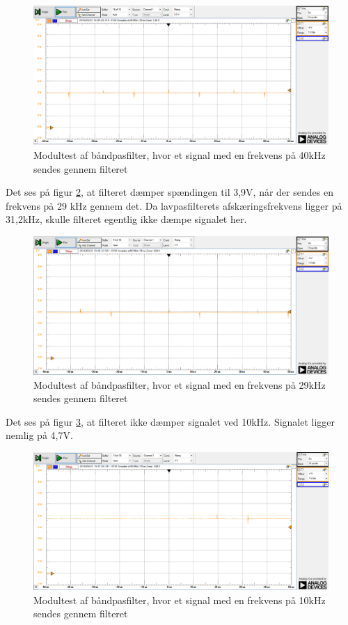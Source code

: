 \begin{figure}[H]
	\centering
	\includegraphics[width=\textwidth]{Test/images/AffyringTest/BaandpasfilterTest/40kHz}
	\caption{Modultest af båndpasfilter, hvor et signal med en frekvens på 40kHz sendes gennem filteret}
	\label{fig:40kHz}
\end{figure}

Det ses på figur \ref{fig:29kHz}, at filteret dæmper spændingen til 3,9V, når der sendes en frekvens på 29 kHz gennem det. Da lavpasfilterets afskæringsfrekvens ligger på 31,2kHz, skulle filteret egentlig ikke dæmpe signalet her. 

\begin{figure}[H]
	\centering
	\includegraphics[width=\textwidth]{Test/images/AffyringTest/BaandpasfilterTest/29kHz}
	\caption{Modultest af båndpasfilter, hvor et signal med en frekvens på 29kHz sendes gennem filteret}
	\label{fig:29kHz}
\end{figure}

Det ses på figur \ref{fig:10kHz}, at filteret ikke dæmper signalet ved 10kHz. Signalet ligger nemlig på 4,7V. 

\begin{figure}[H]
	\centering
	\includegraphics[width=\textwidth]{Test/images/AffyringTest/BaandpasfilterTest/10kHz}
	\caption{Modultest af båndpasfilter, hvor et signal med en frekvens på 10kHz sendes gennem filteret}
	\label{fig:10kHz}
\end{figure}

